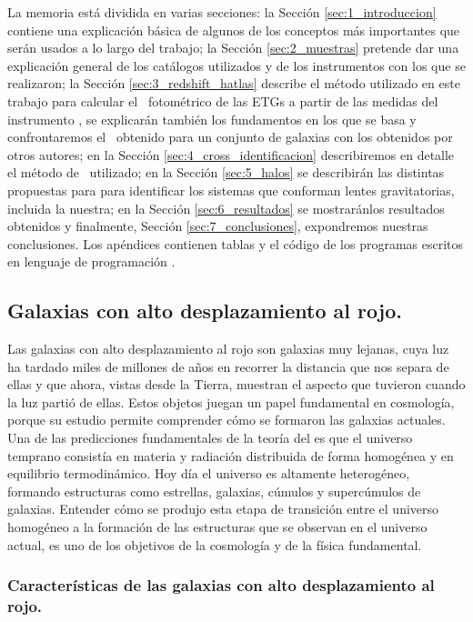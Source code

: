 La memoria está dividida en varias secciones: la Sección \ref{sec:1_introduccion} contiene una explicación básica de algunos de los conceptos más importantes que serán usados a lo largo del trabajo; la Sección \ref{sec:2_muestras} pretende dar una explicación general de los catálogos utilizados y de los instrumentos con los que se realizaron; la Sección \ref{sec:3_redshift_hatlas} describe el método utilizado en este trabajo para calcular el \rt\ fotométrico de las ETGs a partir de las medidas del instrumento \spire, se explicarán también los fundamentos en los que se basa y confrontaremos el \rt\ obtenido para un conjunto de  galaxias con los obtenidos por otros autores; en la Sección \ref{sec:4_cross_identificacion} describiremos en detalle el método de \cross\ utilizado; en la Sección \ref{sec:5_halos} se describirán las distintas propuestas para para identificar los sistemas que conforman lentes gravitatorias, incluida la nuestra; en la Sección \ref{sec:6_resultados} se mostrarán\linebreak los resultados obtenidos y finalmente, Sección \ref{sec:7_conclusiones}, expondremos nuestras conclusiones. Los apéndices contienen tablas y el código de los programas escritos en lenguaje de programación \python.


\subsection{Galaxias con alto desplazamiento al rojo.}\label{subsec:galaxias_alto_rojo}

Las galaxias con alto desplazamiento al rojo son galaxias muy lejanas, cuya luz ha tardado miles de millones de años en recorrer la distancia que nos separa de ellas y que ahora, vistas desde la Tierra, muestran el aspecto que tuvieron cuando la luz partió de ellas. Estos objetos juegan un papel fundamental en cosmología, porque su estudio permite comprender cómo se formaron las galaxias actuales.
Una de las predicciones fundamentales de la teoría del  es que el universo temprano consistía en materia y radiación distribuida de forma homogénea y en equilibrio termodinámico. Hoy día el universo es altamente heterogéneo, formando estructuras como estrellas, galaxias, cúmulos y supercúmulos de galaxias. Entender cómo se produjo esta etapa de transición entre el universo homogéneo a la formación de las estructuras que se observan en el universo actual, es uno de los objetivos de la cosmología y de la física fundamental.

\subsubsection{Características de las galaxias con alto desplazamiento al rojo.}

